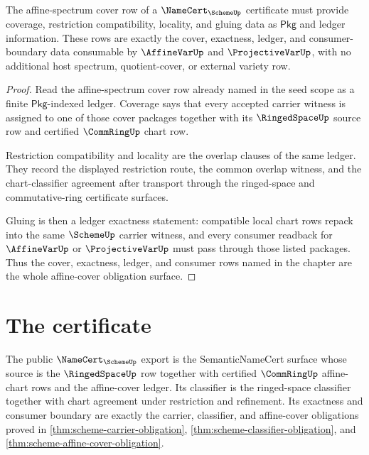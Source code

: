 \begin{theorem}\label{thm:scheme-affine-cover-obligation}
The affine-spectrum cover row of a $\NameCert_{\SchemeUp}$ certificate must provide coverage, restriction compatibility, locality, and gluing data as $\mathsf{Pkg}$ and ledger information. These rows are exactly the cover, exactness, ledger, and consumer-boundary data consumable by $\AffineVarUp$ and $\ProjectiveVarUp$, with no additional host spectrum, quotient-cover, or external variety row.
\end{theorem}
\begin{proof}
Read the affine-spectrum cover row already named in the seed scope as a finite $\mathsf{Pkg}$-indexed ledger. Coverage says that every accepted carrier witness is assigned to one of those cover packages together with its $\RingedSpaceUp$ source row and certified $\CommRingUp$ chart row.

Restriction compatibility and locality are the overlap clauses of the same ledger. They record the displayed restriction route, the common overlap witness, and the chart-classifier agreement after transport through the ringed-space and commutative-ring certificate surfaces.

Gluing is then a ledger exactness statement: compatible local chart rows repack into the same $\SchemeUp$ carrier witness, and every consumer readback for $\AffineVarUp$ or $\ProjectiveVarUp$ must pass through those listed packages. Thus the cover, exactness, ledger, and consumer rows named in the chapter are the whole affine-cover obligation surface.
\end{proof}

\section{The certificate}
\label{sec:scheme-certificate}

\begin{theorem}\label{thm:scheme-public-namecert-surface}
The public $\NameCert_{\SchemeUp}$ export is the SemanticNameCert surface whose source is the $\RingedSpaceUp$ row together with certified $\CommRingUp$ affine-chart rows and the affine-cover ledger. Its classifier is the ringed-space classifier together with chart agreement under restriction and refinement. Its exactness and consumer boundary are exactly the carrier, classifier, and affine-cover obligations proved in \autoref{thm:scheme-carrier-obligation}, \autoref{thm:scheme-classifier-obligation}, and \autoref{thm:scheme-affine-cover-obligation}.
\end{theorem}

